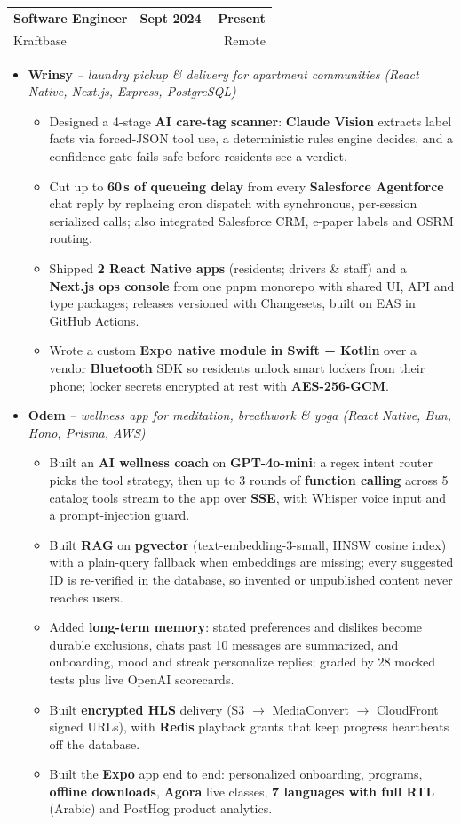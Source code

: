 \documentclass[a4paper,10pt]{article}
\makeatletter
\newcommand{\resumeItem}[1]{\item\small{#1\vspace{-2pt}}}
\newcommand{\resumeRole}[4]{
  \vspace{-1pt}\item
  \begin{tabular*}{\textwidth}[t]{l@{\extracolsep{\fill}}r}
    \textbf{#1} & \small\textbf{#2} \\
    \small{#3} & \small{#4} \\
  \end{tabular*}\vspace{-6pt}
}
\newcommand{\resumeProduct}[2]{
  \item[]\vspace{-2pt}\small{\textbf{#1} \textit{-- #2}}\vspace{-4pt}
}
\newcommand{\resumeListStart}{\begin{itemize}[leftmargin=0.15in, label={}]}
\newcommand{\resumeListEnd}{\end{itemize}}
\newcommand{\resumeItemsStart}{\begin{itemize}[leftmargin=0.2in, itemsep=0pt, label=\textbullet]}
\newcommand{\resumeItemsEnd}{\end{itemize}\vspace{-4pt}}
\makeatother
\begin{document}
  \resumeRole{Software Engineer}{Sept 2024 -- Present}{Kraftbase}{Remote}
  \resumeListStart
    \resumeProduct{Wrinsy}{laundry pickup \& delivery for apartment communities (React Native, Next.js, Express, PostgreSQL)}
    \resumeItemsStart
      \resumeItem{Designed a 4-stage \textbf{AI care-tag scanner}: \textbf{Claude Vision} extracts label facts via forced-JSON tool use, a deterministic rules engine decides, and a confidence gate fails safe before residents see a verdict.}
      \resumeItem{Cut up to \textbf{60\,s of queueing delay} from every \textbf{Salesforce Agentforce} chat reply by replacing cron dispatch with synchronous, per-session serialized calls; also integrated Salesforce CRM, e-paper labels and OSRM routing.}
      \resumeItem{Shipped \textbf{2 React Native apps} (residents; drivers \& staff) and a \textbf{Next.js ops console} from one pnpm monorepo with shared UI, API and type packages; releases versioned with Changesets, built on EAS in GitHub Actions.}
      \resumeItem{Wrote a custom \textbf{Expo native module in Swift + Kotlin} over a vendor \textbf{Bluetooth} SDK so residents unlock smart lockers from their phone; locker secrets encrypted at rest with \textbf{AES-256-GCM}.}
    \resumeItemsEnd

    \resumeProduct{Odem}{wellness app for meditation, breathwork \& yoga (React Native, Bun, Hono, Prisma, AWS)}
    \resumeItemsStart
      \resumeItem{Built an \textbf{AI wellness coach} on \textbf{GPT-4o-mini}: a regex intent router picks the tool strategy, then up to 3 rounds of \textbf{function calling} across 5 catalog tools stream to the app over \textbf{SSE}, with Whisper voice input and a prompt-injection guard.}
      \resumeItem{Built \textbf{RAG} on \textbf{pgvector} (text-embedding-3-small, HNSW cosine index) with a plain-query fallback when embeddings are missing; every suggested ID is re-verified in the database, so invented or unpublished content never reaches users.}
      \resumeItem{Added \textbf{long-term memory}: stated preferences and dislikes become durable exclusions, chats past 10 messages are summarized, and onboarding, mood and streak personalize replies; graded by 28 mocked tests plus live OpenAI scorecards.}
      \resumeItem{Built \textbf{encrypted HLS} delivery (S3 $\rightarrow$ MediaConvert $\rightarrow$ CloudFront signed URLs), with \textbf{Redis} playback grants that keep progress heartbeats off the database.}
      \resumeItem{Built the \textbf{Expo} app end to end: personalized onboarding, programs, \textbf{offline downloads}, \textbf{Agora} live classes, \textbf{7 languages with full RTL} (Arabic) and PostHog product analytics.}
    \resumeItemsEnd
  \resumeListEnd
\end{document}
